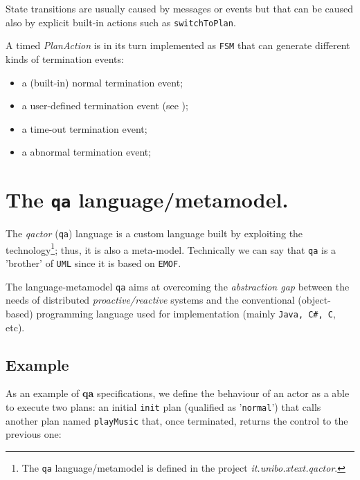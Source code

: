 State transitions are usually caused by messages or events but that can be caused also by explicit built-in actions such as \texttt{switchToPlan}.

A timed \textit{PlanAction} is in its turn implemented as \texttt{FSM} that can generate different kinds of termination events:
\begin{itemize}
\item a (built-in) normal termination event;
\item a user-defined termination event (see );
\item a time-out termination event;
\item a abnormal termination event;
\end{itemize}


\newpage 
\section{The \texttt{qa} language/metamodel.}

The \textit{qactor} (\texttt{qa}) language is a custom language built by exploiting the \xtext{} technology\footnote{The \texttt{qa} language/metamodel is defined in the project \textit{it.unibo.xtext.qactor}.}; thus, it is also a meta-model. Technically we can say that \texttt{qa} is a 'brother' of \texttt{UML} since it is based on \texttt{EMOF}.

The language-metamodel \texttt{qa} aims at overcoming the \textit{abstraction gap} between the needs of distributed \textit{proactive/reactive} systems and the conventional (object-based) programming language used for implementation (mainly \texttt{Java, C\#, C}, etc).

\subsection{Example}

As an example of \textbf{qa} specifications, we define the behaviour of an actor as a \qa{} able to execute two plans: an initial \texttt{init} plan (qualified as '\texttt{normal}') that calls another plan named \texttt{playMusic} that, once terminated, returns the control to the previous one:

